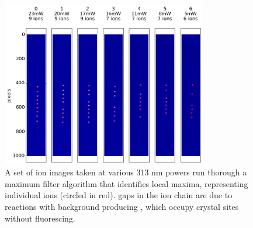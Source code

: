 \begin{figure}[H]
	\centering
	\includegraphics[width=0.8\textwidth]{images/ion_images.png}
	\caption{A set of ion images taken at various 313 nm powers run thorough a maximum filter algorithm that identifies local maxima, representing individual ions (circled in red). gaps in the ion chain are due to reactions with background  producing , which occupy crystal sites without fluorescing.}
	\label{fig: ion image set}
\end{figure}

